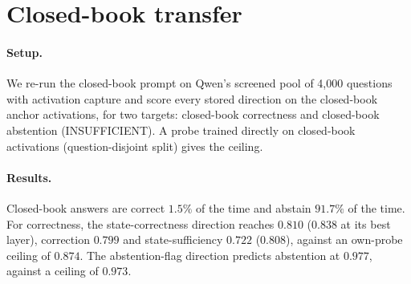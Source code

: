 \section{Closed-book transfer}
\label{app:closedbook}
\paragraph{Setup.} We re-run the closed-book prompt on Qwen's screened pool of 4{,}000 questions with activation capture and score every stored direction on the closed-book anchor activations, for two targets: closed-book correctness and closed-book abstention (INSUFFICIENT). A probe trained directly on closed-book activations (question-disjoint split) gives the ceiling.

\paragraph{Results.} Closed-book answers are correct $1.5\%$ of the time and abstain $91.7\%$ of the time. For correctness, the state-correctness direction reaches $0.810$ ($0.838$ at its best layer), correction $0.799$ and state-sufficiency $0.722$ ($0.808$), against an own-probe ceiling of $0.874$. The abstention-flag direction predicts abstention at $0.977$, against a ceiling of $0.973$.
